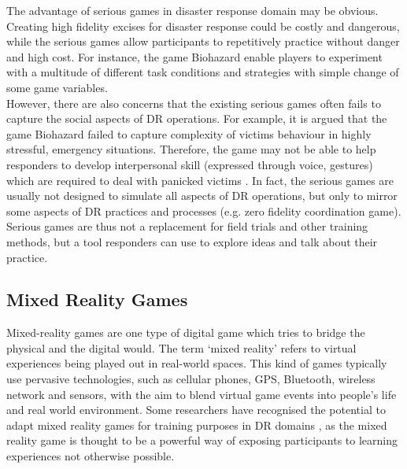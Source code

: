 The advantage of serious games in disaster response domain may be obvious. Creating high fidelity excises for disaster response could be costly and dangerous, while the serious games allow participants to repetitively practice without danger and high cost. For instance, the game Biohazard \cite{Susi2007} enable players to experiment with a multitude of different task conditions and strategies with simple change of some game variables.\\

However, there are also concerns that the existing serious games often fails to capture the social aspects of \ac{DR} operations. For example, it is argued that the game Biohazard failed to capture complexity of victims behaviour in highly stressful, emergency situations. Therefore, the game may not be able to help responders to develop interpersonal skill (expressed through voice, gestures) which are required to deal with panicked victims \cite{Susi2007}. In fact, the serious games are usually not designed to simulate all aspects of DR operations, but only to mirror some aspects of \ac{DR} practices and processes (e.g. zero fidelity coordination game). Serious games are thus not a replacement for field trials and other training methods, but a tool responders can use to explore ideas and talk about their practice.\\


\subsection{Mixed Reality Games}
Mixed-reality games are one type of digital game which tries to bridge the physical and the digital \cite{Benford2005} would. The term `mixed reality' refers to virtual experiences being played out in real-world spaces. This kind of games typically use pervasive technologies, such as cellular phones, GPS, Bluetooth, wireless network and sensors, with the aim to blend virtual game events into people's life and real world environment. Some researchers have recognised the potential to adapt mixed reality games for training purposes in \ac{DR} domains \cite{Fischer2012}, as the mixed reality game is thought to be a powerful way of exposing participants to learning experiences not otherwise possible. \\

